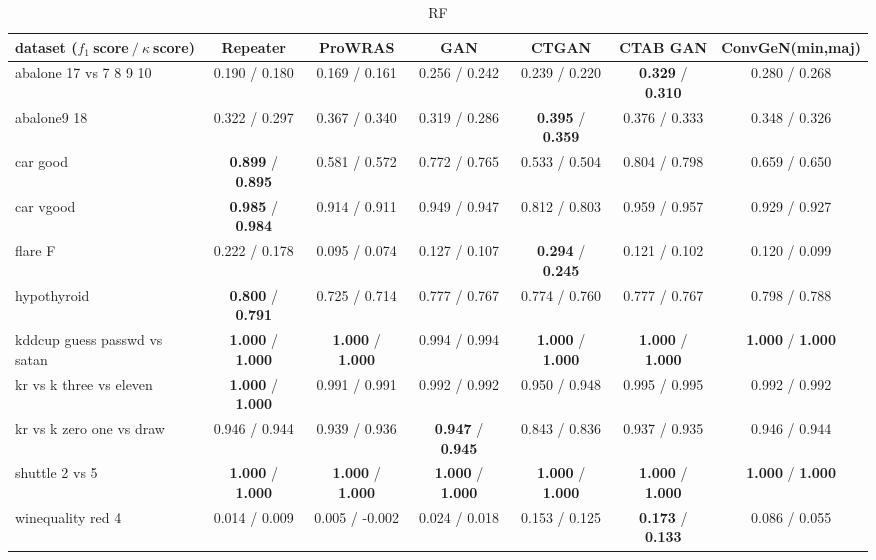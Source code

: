 
\begin{table*}[ht]\scriptsize\caption{RF}\label{tab:results:RF:A}\centering\tabularnewline
\begin{tabular}{l|@{\hskip3pt}c@{\hskip3pt}|@{\hskip3pt}c@{\hskip3pt}|@{\hskip3pt}c@{\hskip3pt}|@{\hskip3pt}c@{\hskip3pt}|@{\hskip3pt}c@{\hskip3pt}|@{\hskip3pt}c@{\hskip3pt}}\hline
\textbf{dataset ($f_1~$score$~/~\kappa~$score)} & \textbf{Repeater} & \textbf{ProWRAS} & \textbf{GAN} & \textbf{CTGAN} & \textbf{CTAB GAN} & \textbf{ConvGeN(min,maj)}
\tabularnewline
\hline
abalone 17 vs 7 8 9 10 &  0.190  /  0.180  &  0.169  /  0.161  &  0.256  /  0.242  &  0.239  /  0.220  &  \textbf{0.329}  /  \textbf{0.310}  &  0.280  /  0.268 
\tabularnewline
abalone9 18 &  0.322  /  0.297  &  0.367  /  0.340  &  0.319  /  0.286  &  \textbf{0.395}  /  \textbf{0.359}  &  0.376  /  0.333  &  0.348  /  0.326 
\tabularnewline
car good &  \textbf{0.899}  /  \textbf{0.895}  &  0.581  /  0.572  &  0.772  /  0.765  &  0.533  /  0.504  &  0.804  /  0.798  &  0.659  /  0.650 
\tabularnewline
car vgood &  \textbf{0.985}  /  \textbf{0.984}  &  0.914  /  0.911  &  0.949  /  0.947  &  0.812  /  0.803  &  0.959  /  0.957  &  0.929  /  0.927 
\tabularnewline
flare F &  0.222  /  0.178  &  0.095  /  0.074  &  0.127  /  0.107  &  \textbf{0.294}  /  \textbf{0.245}  &  0.121  /  0.102  &  0.120  /  0.099 
\tabularnewline
hypothyroid &  \textbf{0.800}  /  \textbf{0.791}  &  0.725  /  0.714  &  0.777  /  0.767  &  0.774  /  0.760  &  0.777  /  0.767  &  0.798  /  0.788 
\tabularnewline
kddcup guess passwd vs satan &  \textbf{1.000}  /  \textbf{1.000}  &  \textbf{1.000}  /  \textbf{1.000}  &  0.994  /  0.994  &  \textbf{1.000}  /  \textbf{1.000}  &  \textbf{1.000}  /  \textbf{1.000}  &  \textbf{1.000}  /  \textbf{1.000} 
\tabularnewline
kr vs k three vs eleven &  \textbf{1.000}  /  \textbf{1.000}  &  0.991  /  0.991  &  0.992  /  0.992  &  0.950  /  0.948  &  0.995  /  0.995  &  0.992  /  0.992 
\tabularnewline
kr vs k zero one vs draw &  0.946  /  0.944  &  0.939  /  0.936  &  \textbf{0.947}  /  \textbf{0.945}  &  0.843  /  0.836  &  0.937  /  0.935  &  0.946  /  0.944 
\tabularnewline
shuttle 2 vs 5 &  \textbf{1.000}  /  \textbf{1.000}  &  \textbf{1.000}  /  \textbf{1.000}  &  \textbf{1.000}  /  \textbf{1.000}  &  \textbf{1.000}  /  \textbf{1.000}  &  \textbf{1.000}  /  \textbf{1.000}  &  \textbf{1.000}  /  \textbf{1.000} 
\tabularnewline
winequality red 4 &  0.014  /  0.009  &  0.005  /  -0.002  &  0.024  /  0.018  &  0.153  /  0.125  &  \textbf{0.173}  /  \textbf{0.133}  &  0.086  /  0.055 

\end{tabular}
\end{table*}
